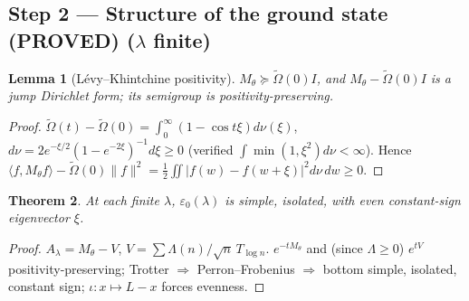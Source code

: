 \documentclass[11pt]{article}
\newtheorem{theorem}{Theorem}[section]
\newtheorem{lemma}[theorem]{Lemma}
\theoremstyle{remark}
\newcommand{\Om}{\widetilde{\Omega}}
\newcommand{\ve}{\varepsilon}
\newcommand{\PROVED}{\textbf{(PROVED)}}
\begin{document}
\subsection{Step 2 --- Structure of the ground state \PROVED{} ($\lambda$ finite)}
\begin{lemma}[L\'evy--Khintchine positivity]
$M_\theta\succeq\Om(0)I$, and $M_\theta-\Om(0)I$ is a jump Dirichlet form; its semigroup is
positivity-preserving.
\end{lemma}
\begin{proof}
$\Om(t)-\Om(0)=\int_0^\infty(1-\cos t\xi)d\nu(\xi)$, $d\nu=2e^{-\xi/2}(1-e^{-2\xi})^{-1}d\xi\ge0$
(verified $\int\min(1,\xi^2)d\nu<\infty$). Hence
$\langle f,M_\theta f\rangle-\Om(0)\|f\|^2=\tfrac12\iint|f(w)-f(w+\xi)|^2d\nu\,dw\ge0$.
\end{proof}
\begin{theorem}
At each finite $\lambda$, $\ve_0(\lambda)$ is simple, isolated, with even constant-sign
eigenvector $\xi$.
\end{theorem}
\begin{proof}
$A_\lambda=M_\theta-V$, $V=\sum\Lambda(n)/\sqrt n\,T_{\log n}$. $e^{-tM_\theta}$ and (since
$\Lambda\ge0$) $e^{tV}$ positivity-preserving; Trotter $\Rightarrow$ Perron--Frobenius
$\Rightarrow$ bottom simple, isolated, constant sign; $\iota:x\mapsto L-x$ forces evenness.
\end{proof}
\end{document}
